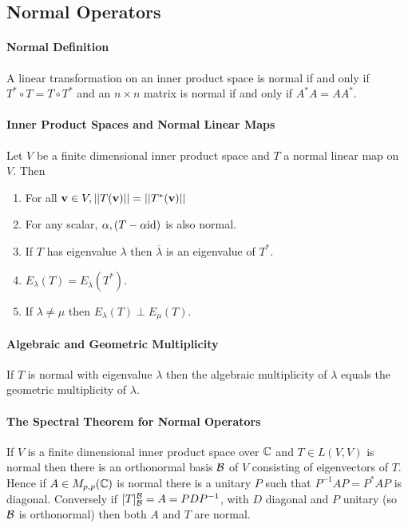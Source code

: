 \subsection{Normal Operators}
\paragraph{Normal Definition}
A linear transformation on an inner product space is normal if and only if \(T^* \circ T = T \circ T^*\) and an \(n \times n\) matrix is normal if and only if \(A^*A = AA^*\).

\paragraph{Inner Product Spaces and Normal Linear Maps}
Let \(V\) be a finite dimensional inner product space and \(T\) a normal linear map on \(V\). Then
\begin{enumerate}[label=(\alph*)]
    \item For all \(\mathbf{v} \in V, ||T(\mathbf{v})|| = ||T^*(\mathbf{v})||\)
    \item For any scalar, \(\alpha, (T - \alpha\mathrm{id})\) is also normal.
    \item If \(T\) has eigenvalue \(\lambda\) then \(\overline{\lambda}\) is an eigenvalue of \(T^*\).
    \item \(E_\lambda(T) = E_{\overline{\lambda}}(T^*)\).
    \item If \(\lambda \neq \mu\) then \(E_\lambda(T) \perp E_\mu(T)\).
\end{enumerate}

\paragraph{Algebraic and Geometric Multiplicity}
If \(T\) is normal with eigenvalue \(\lambda\) then the algebraic multiplicity of \(\lambda\) equals the geometric multiplicity of \(\lambda\).

\paragraph{The Spectral Theorem for Normal Operators}
If \(V\) is a finite dimensional inner product space over \(\mathbb{C}\) and \(T \in L(V,V)\) is normal then there is an orthonormal basis \(\mathcal{B}\) of \(V\) consisting of eigenvectors of \(T\). Hence if \(A \in M_{p,p}(\mathbb{C})\) is normal there is a unitary \(P\) such that \(P^{-1}AP = P^*AP\) is diagonal. Conversely if \([T]_{\mathcal{B}}^{\mathcal{B}} = A = PDP^{-1}\), with \(D\) diagonal and \(P\) unitary (so \(\mathcal{B}\) is orthonormal) then both \(A\) and \(T\) are normal. 

